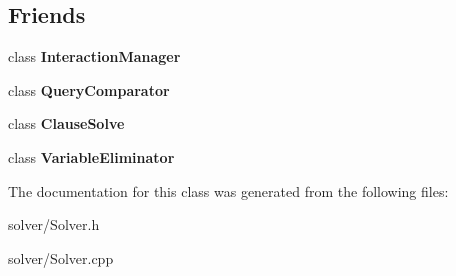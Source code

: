 \subsection*{\-Friends}
\begin{DoxyCompactItemize}
\item 
\hypertarget{classSolver_ace1aed02802f62c643a37b8a67e67bee}{class {\bfseries \-Interaction\-Manager}}\label{classSolver_ace1aed02802f62c643a37b8a67e67bee}

\item 
\hypertarget{classSolver_a16b09189cdaf88044be661f54a1313a7}{class {\bfseries \-Query\-Comparator}}\label{classSolver_a16b09189cdaf88044be661f54a1313a7}

\item 
\hypertarget{classSolver_a56fe9a9a7bc899066de30f41d508f524}{class {\bfseries \-Clause\-Solve}}\label{classSolver_a56fe9a9a7bc899066de30f41d508f524}

\item 
\hypertarget{classSolver_aa97b604ea37345da6b2414f0892e2664}{class {\bfseries \-Variable\-Eliminator}}\label{classSolver_aa97b604ea37345da6b2414f0892e2664}

\end{DoxyCompactItemize}


\-The documentation for this class was generated from the following files\-:\begin{DoxyCompactItemize}
\item 
solver/\-Solver.\-h\item 
solver/\-Solver.\-cpp\end{DoxyCompactItemize}
